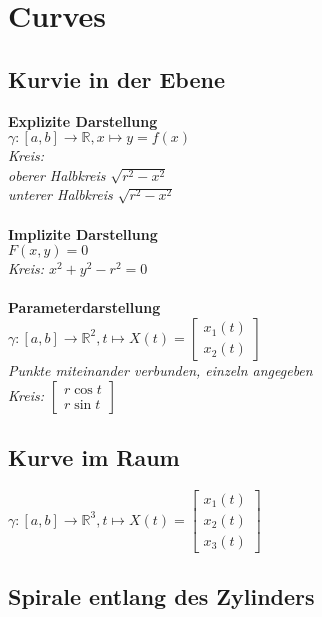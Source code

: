 \section{Curves}

\subsection{Kurvie in der Ebene}

\textbf{Explizite Darstellung} \\
$\gamma : [a,b] \rightarrow \mathbb{R} , x \mapsto y = f(x)$ \\
\textit{Kreis: \\oberer Halbkreis $\sqrt{r^2 - x^2}$ \\ unterer Halbkreis $\sqrt{r^2 - x^2}$} \\
\\
\textbf{Implizite Darstellung} \\
$F(x,y) = 0$ \\
\textit{Kreis: $x^2 + y^2 - r^2 = 0$} \\
\\
\textbf{Parameterdarstellung} \\
$\gamma : [a,b] \rightarrow \mathbb{R}^2,t \mapsto X(t) = \begin{bmatrix} x_1(t) \\ x_2(t) \end{bmatrix}$ \\
\textit{Punkte miteinander verbunden, einzeln angegeben} \\
\textit{Kreis: $\begin{bmatrix} r \cos t \\ r \sin t \end{bmatrix}$}
\\

\subsection{Kurve im Raum}

$\gamma : [a,b] \rightarrow \mathbb{R}^3,t \mapsto X(t) = 
\begin{bmatrix}
    x_1(t) \\
    x_2(t) \\
    x_3(t)
\end{bmatrix}$

\subsection{Spirale entlang des Zylinders}

